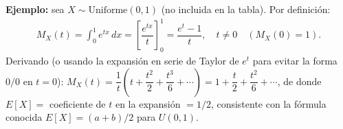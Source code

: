 \begin{solproblema}[prob:a48cc99]
	\textbf{Ejemplo:} sea $X \sim \text{Uniforme}(0,1)$ (no incluida en la tabla). Por definición:
	\begin{align*}
		M_X(t) = \int_0^1 e^{tx}\,dx = \left[\dfrac{e^{tx}}{t}\right]_0^1 = \dfrac{e^t-1}{t}, \quad t\neq0 \quad (M_X(0)=1).
	\end{align*}
	Derivando (o usando la expansión en serie de Taylor de $e^t$ para evitar la forma $0/0$ en $t=0$): $M_X(t) = \dfrac{1}{t}\left(t+\dfrac{t^2}{2}+\dfrac{t^3}{6}+\cdots\right) = 1+\dfrac{t}{2}+\dfrac{t^2}{6}+\cdots$, de donde $E[X] = $ coeficiente de $t$ en la expansión $= 1/2$, consistente con la fórmula conocida $E[X]=(a+b)/2$ para $U(0,1)$.
\end{solproblema}
